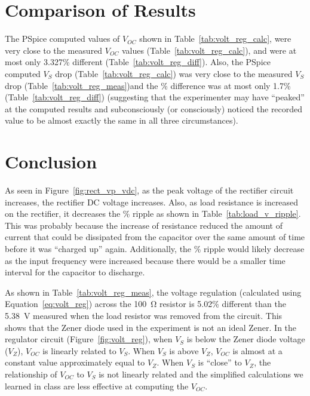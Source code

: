 \documentclass{article}
\begin{document}
\section{Comparison of Results}
\label{sec:comp_of_res}

The PSpice computed values of $V_{OC}$ shown in Table~\ref{tab:volt_reg_calc}, were very close to the measured $V_{OC}$ values (Table~\ref{tab:volt_reg_calc}), and were at most only 3.327\% different (Table~\ref{tab:volt_reg_diff}).  Also, the PSpice computed $V_S$ drop (Table~\ref{tab:volt_reg_calc}) was very close to the measured $V_S$ drop (Table~\ref{tab:volt_reg_meas})and the \% difference was at most only 1.7\% (Table~\ref{tab:volt_reg_diff}) (suggesting that the experimenter may have “peaked” at the computed results and subconsciously (or consciously) noticed the recorded value to be almost exactly the same in all three circumstances).

\section{Conclusion}
\label{sec:conclusion}

As seen in Figure~\ref{fig:rect_vp_vdc}, as the peak voltage of the rectifier circuit increases, the rectifier DC voltage increases.  Also, as load resistance is increased on the rectifier, it decreases the \% ripple as shown in Table~\ref{tab:load_v_ripple}.  This was probably because the increase of resistance reduced the amount of current that could be dissipated from the capacitor over the same amount of time before it was “charged up” again.  Additionally, the \% ripple would likely decrease as the input frequency were increased because there would be a smaller time interval for the capacitor to discharge. 

As shown in Table~\ref{tab:volt_reg_meas}, the voltage regulation (calculated using Equation~\ref{eq:volt_reg}) across the \SI{100}{\ohm} resistor is 5.02\% different than the \SI{5.38}{V} measured when the load resistor was removed from the circuit. This shows that the Zener diode used in the experiment is not an ideal Zener. In the regulator circuit (Figure~\ref{fig:volt_reg}), when $V_S$ is below the Zener diode voltage ($V_Z$), $V_{OC}$ is linearly related to $V_S$. When $V_S$ is above $V_Z$, $V_{OC}$ is almost at a constant value approximately equal to $V_Z$. When $V_S$ is “close” to $V_Z$, the relationship of $V_{OC}$ to $V_S$ is not linearly related and the simplified calculations we learned in class are less effective at computing the $V_{OC}$. 
\end{document}
